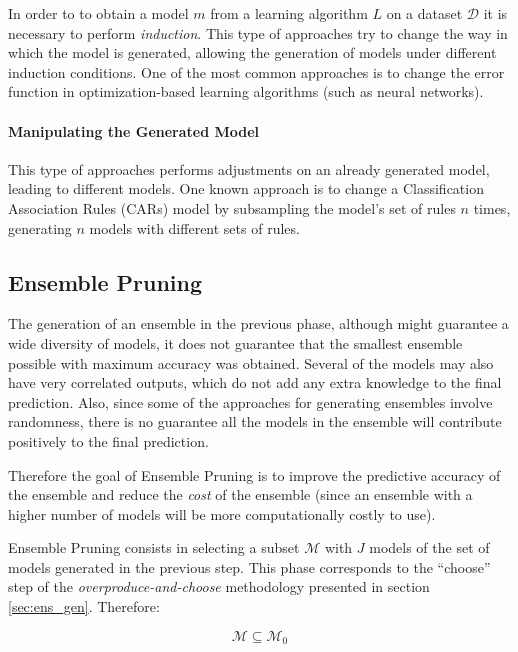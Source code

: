 In order to to obtain a model $m$ from a learning algorithm $L$ on a dataset $\mathcal{D}$ it is necessary to perform \textit{induction}. This type of approaches try to change the way in which the model is generated, allowing the generation of models under different induction conditions.
One of the most common approaches is to change the error function in optimization-based learning algorithms (such as neural networks).

\paragraph{Manipulating the Generated Model}\mbox{}

This type of approaches performs adjustments on an already generated model, leading to different models.
One known approach is to change a Classification Association Rules (CARs) model by subsampling the model's set of rules $n$ times, generating $n$ models with different sets of rules. 

\subsection{Ensemble Pruning}

The generation of an ensemble in the previous phase, although might guarantee a wide diversity of models, it does not guarantee that the smallest ensemble possible with maximum accuracy was obtained. Several of the models may also have very correlated outputs, which do not add any extra knowledge to the final prediction.
Also, since some of the approaches for generating ensembles involve randomness, there is no guarantee all the models in the ensemble will contribute positively to the final prediction.

Therefore the goal of Ensemble Pruning is to improve the predictive accuracy of the ensemble and reduce the \textit{cost} of the ensemble (since an ensemble with a higher number of models will be more computationally costly to use).

Ensemble Pruning consists in selecting a subset $\mathcal{M}$ with $J$ models of the set of models generated in the previous step.
This phase corresponds to the ``choose'' step of the \textit{overproduce-and-choose} methodology presented in section \ref{sec:ens_gen}. Therefore:

\begin{equation}
\mathcal{M} \subseteq \mathcal{M}_0
\end{equation}

